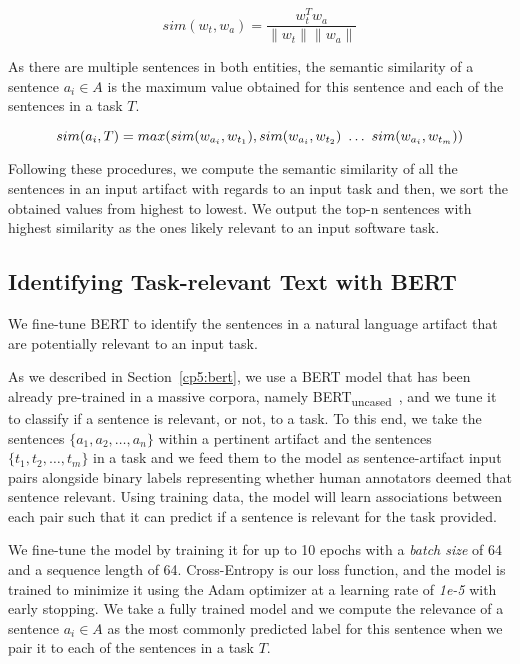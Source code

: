 \begin{equation}
    sim(w_t,w_a) = \frac{w_t^Tw_a}{\|w_t\| \|w_a\|}
    \label{eq:word-sim}
\end{equation}
 
\smallskip
 As there are multiple sentences in both entities, the semantic similarity of a sentence $a_i \in A$ is the maximum value obtained for this sentence and each of the sentences in a task $T$.

 \begin{equation}
    sim(a_i, T) = max(sim(w_{a_i}, w_{t_1}), sim(w_{a_i}, w_{t_2}) ~\dots~ sim(w_{a_i}, w_{t_m})) \\
\end{equation}

\smallskip
Following these procedures, we compute the semantic similarity of all the sentences in an input artifact with regards to an input task and then, 
we sort the obtained values from highest to lowest. We output the top-n sentences with highest similarity as the ones likely relevant to an input software task.


\subsection{Identifying Task-relevant Text with BERT}
\label{cp5:approach-bert}



We fine-tune BERT to identify the sentences in a natural language artifact that are potentially relevant to an input task.



As we described in Section~\ref{cp5:bert}, we use a BERT model that has been already pre-trained in a massive corpora, namely BERT\textsubscript{uncased}~\cite{Devlin2018Bert}, and we tune it to classify if a sentence is relevant, or not, to a task.
To this end, we take the sentences $\{a_1, a_2, \dots, a_n\}$ within a pertinent artifact and the sentences $\{t_1, t_2, \dots, t_m\}$ in a task and we feed them to the model as sentence-artifact input pairs 
alongside binary labels representing whether human annotators deemed that sentence relevant. 
Using training data, the model will learn associations between each pair such that it can predict if a sentence is relevant for the task provided. 

We fine-tune the model by training it for up to 10 epochs with a \textit{batch size} of 64 and a sequence length of 64. Cross-Entropy is our loss function, and the model is trained to minimize it using the Adam optimizer at a learning rate of \textit{1e-5} with early stopping. 
We take a fully trained model and we compute the relevance of a sentence $a_i \in A$ as the most commonly predicted label for this sentence when we pair it to each of the sentences in a task $T$.


